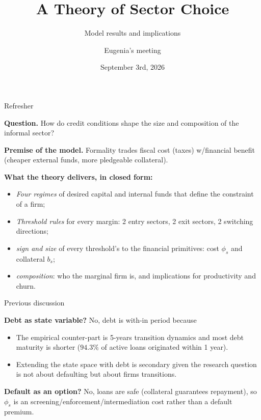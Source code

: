 \documentclass[11pt,aspectratio=169]{beamer}
\title[Formality and finance: theory]{A Theory of Sector Choice}
\subtitle{Model results and implications}
\author{Eugenia's meeting}
\date{September 3rd, 2026}
\providecommand{\spread}[1]{\phi_{#1}}
\providecommand{\collat}[1]{b_{#1}}
\begin{document}
 
\begin{frame}
\titlepage
\end{frame}
 

\begin{frame}{Refresher}

\textbf{Question.} How do credit conditions shape the size and
composition of the informal sector?
 
\bigskip
\textbf{Premise of the model.} Formality trades fiscal cost (taxes) w/financial benefit (cheaper external funds, more pledgeable collateral).
 
\bigskip
\textbf{What the theory delivers, in closed form:}

\begin{itemize}
    \item \emph{Four regimes} of desired capital and internal funds that define the constraint of a firm;
  \item \emph{Threshold rules} for every margin: 2 entry sectors, 2 exit sectors, 2 switching directions;
  \item \emph{sign and size} of every threshold's to the financial primitives: cost $\spread{s}$ and collateral $\collat{s}$;
  \item \emph{composition}: who the marginal firm is, and implications for productivity and churn.
\end{itemize}

\end{frame}

\begin{frame}{Previous discussion}

\textbf{Debt as state variable?} No, debt is with-in period because
\begin{itemize}
    \item The empirical counter-part is 5-years transition dynamics and most debt maturity is shorter ($94.3\%$ of active loans originated within 1 year).
    \item Extending the state space with debt is secondary given the research question is not about defaulting but about firms transitions. 
\end{itemize}

\vspace{5mm}

\textbf{Default as an option?} No, loans are safe (collateral guarantees repayment), so
$\spread{s}$ is an screening/enforcement/intermediation cost rather than a default premium. 

\end{frame}
 
\end{document}
